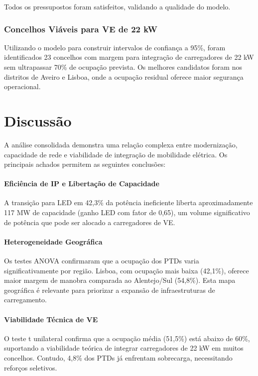 \documentclass[conference]{IEEEtran}
\begin{document}
Todos os pressupostos foram satisfeitos, validando a qualidade do modelo.

\subsubsection{Concelhos Viáveis para VE de 22 kW}
Utilizando o modelo para construir intervalos de confiança a 95\%, foram identificados 23 concelhos com margem para integração de carregadores de 22 kW sem ultrapassar 70\% de ocupação prevista. Os melhores candidatos foram nos distritos de Aveiro e Lisboa, onde a ocupação residual oferece maior segurança operacional.

\section{Discussão}

A análise consolidada demonstra uma relação complexa entre modernização, capacidade de rede e viabilidade de integração de mobilidade elétrica. Os principais achados permitem as seguintes conclusões:

\paragraph{Eficiência de IP e Libertação de Capacidade}
A transição para LED em 42,3\% da potência ineficiente liberta aproximadamente 117 MW de capacidade (ganho LED com fator de 0,65), um volume significativo de potência que pode ser alocado a carregadores de VE.

\paragraph{Heterogeneidade Geográfica}
Os testes ANOVA confirmaram que a ocupação dos PTDs varia significativamente por região. Lisboa, com ocupação mais baixa (42,1\%), oferece maior margem de manobra comparada ao Alentejo/Sul (54,8\%). Esta mapa geográfica é relevante para priorizar a expansão de infraestruturas de carregamento.

\paragraph{Viabilidade Técnica de VE}
O teste t unilateral confirma que a ocupação média (51,5\%) está abaixo de 60\%, suportando a viabilidade teórica de integrar carregadores de 22 kW em muitos concelhos. Contudo, 4,8\% dos PTDs já enfrentam sobrecarga, necessitando reforços seletivos.
\end{document}
